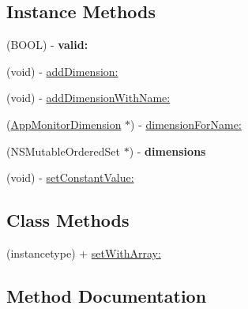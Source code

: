 \subsection*{Instance Methods}
\begin{DoxyCompactItemize}
\item 
\mbox{\label{interface_app_monitor_dimension_set_ac39a36ee4feec59e5bb98e7070f20bf6}} 
(B\+O\+OL) -\/ {\bfseries valid\+:}
\item 
(void) -\/ \mbox{\hyperlink{interface_app_monitor_dimension_set_a7bac53c2d5a60d6994f86a6fb9203a83}{add\+Dimension\+:}}
\item 
(void) -\/ \mbox{\hyperlink{interface_app_monitor_dimension_set_a870cca90ab09746a0ae54cdbe10e0327}{add\+Dimension\+With\+Name\+:}}
\item 
(\mbox{\hyperlink{interface_app_monitor_dimension}{App\+Monitor\+Dimension}} $\ast$) -\/ \mbox{\hyperlink{interface_app_monitor_dimension_set_a8a5e89b28f399eea797953e6e2420330}{dimension\+For\+Name\+:}}
\item 
\mbox{\label{interface_app_monitor_dimension_set_ad09b5c9fc7b2423d82ff51fa139206c3}} 
(N\+S\+Mutable\+Ordered\+Set $\ast$) -\/ {\bfseries dimensions}
\item 
(void) -\/ \mbox{\hyperlink{interface_app_monitor_dimension_set_abdb8fb0d024ceb92c0a386317702a04e}{set\+Constant\+Value\+:}}
\end{DoxyCompactItemize}
\subsection*{Class Methods}
\begin{DoxyCompactItemize}
\item 
(instancetype) + \mbox{\hyperlink{interface_app_monitor_dimension_set_a7857e701c8f458842a22fe4450a4e8ee}{set\+With\+Array\+:}}
\end{DoxyCompactItemize}


\subsection{Method Documentation}
\mbox{\label{interface_app_monitor_dimension_set_a7bac53c2d5a60d6994f86a6fb9203a83}} 
